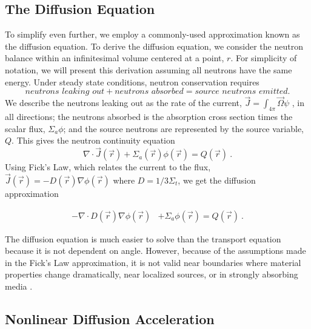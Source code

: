 \subsection{The Diffusion Equation}
To simplify even further, we employ a commonly-used approximation known as the diffusion equation. To derive the diffusion equation, we consider the neutron balance within an infinitesimal volume centered at a point, $r$. For simplicity of notation, we will present this derivation assuming all neutrons have the same energy. Under steady state conditions, neutron conservation requires
%
\begin{equation}
    \textit{neutrons leaking out} + \textit{neutrons absorbed} = \textit{source neutrons emitted}.
\end{equation}
We describe the neutrons leaking out as the rate of the current, $\vec{J} = \int_{4\pi} \vec{\Omega}\psi$ , in all directions; the neutrons absorbed is the absorption cross section times the scalar flux, $\Sigma_a\phi$; and the source neutrons are represented by the source variable, $Q$. This gives the neutron continuity equation
\begin{equation}

\nabla\cdot \vec{J}(\vec{r}) + \Sigma_a(\vec{r})\phi(\vec{r}) = Q(\vec{r})\:.

\end{equation}
Using Fick's Law, which relates the current to the flux, $\vec{J}(\vec{r}) = -D(\vec{r})\nabla\phi(\vec{r})$ where $D = 1/3\Sigma_t$, we get the diffusion approximation

\begin{equation}
\begin{split}
 - \nabla \cdot D(\vec{r})\nabla\phi(\vec{r}) &+ \Sigma_a \phi(\vec{r}) = Q(\vec{r})\:.
\end{split}
\label{eq:diffusion_fixed_source}
\end{equation}

The diffusion equation is much easier to solve than the transport equation because it is not dependent on angle. However, because of the assumptions made in the Fick's Law approximation, it is not valid near boundaries where material properties change dramatically, near localized sources, or in strongly absorbing media \cite{lewis-miller}.

\subsection{Nonlinear Diffusion Acceleration}

